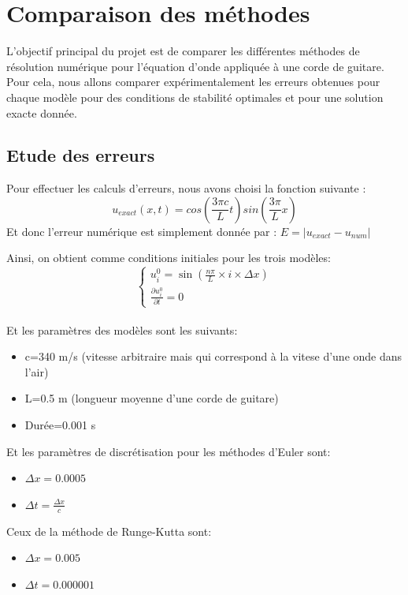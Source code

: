 \section{Comparaison des méthodes}
L'objectif principal du projet est de comparer les différentes méthodes de résolution numérique pour l'équation d'onde appliquée à une corde de guitare.
Pour cela, nous allons comparer expérimentalement les erreurs obtenues pour chaque modèle pour des conditions de stabilité optimales et pour une solution exacte donnée.

\subsection{Etude des erreurs}
Pour effectuer les calculs d'erreurs, nous avons choisi la fonction suivante :
\begin{equation*}
    u_{exact}(x,t)=cos(\frac{3 \pi c}{L}t)sin(\frac{3 \pi }{L}x )
\end{equation*}
Et donc l'erreur numérique est simplement donnée par :
     $E=|u_{exact} - u_{num}|$

Ainsi, on obtient comme conditions initiales pour les trois modèles:
  \[
      \begin{cases}
        u^{0}_{i}=\sin(\frac{n \pi }{L} \times i \times \Delta x) \\
        \frac{\partial u^0_{i}}{\partial t}= 0
      \end{cases}
    \]\\
Et les paramètres des modèles sont les suivants:
\begin{itemize}
    \item c=340 m/s (vitesse arbitraire mais qui correspond à la vitese d'une onde dans l'air)
    \item L=0.5 m (longueur moyenne d'une corde de guitare)
    \item Durée=0.001 s\\ 
\end{itemize}
Et les paramètres de discrétisation pour les méthodes d'Euler sont:
\begin{itemize}
    \item $\Delta x=0.0005$
    \item $\Delta t=\frac{\Delta x}{c}$
\end{itemize}
Ceux de la méthode de Runge-Kutta sont: 
\begin{itemize}
    \item $\Delta x=0.005$
    \item $\Delta t=0.000001$
\end{itemize}

